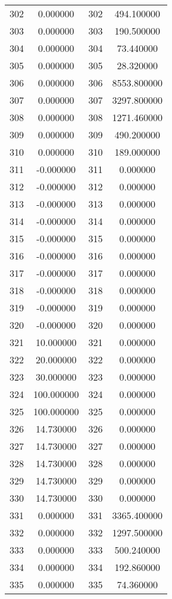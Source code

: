 \documentclass[12pt]{article}
\begin{document}
\begin{longtable}{@{}cccc@{}}
302 & 0.000000 & 302 & 494.100000 \\
303 & 0.000000 & 303 & 190.500000 \\
304 & 0.000000 & 304 & 73.440000 \\
305 & 0.000000 & 305 & 28.320000 \\
306 & 0.000000 & 306 & 8553.800000 \\
307 & 0.000000 & 307 & 3297.800000 \\
308 & 0.000000 & 308 & 1271.460000 \\
309 & 0.000000 & 309 & 490.200000 \\
310 & 0.000000 & 310 & 189.000000 \\
311 & -0.000000 & 311 & 0.000000 \\
312 & -0.000000 & 312 & 0.000000 \\
313 & -0.000000 & 313 & 0.000000 \\
314 & -0.000000 & 314 & 0.000000 \\
315 & -0.000000 & 315 & 0.000000 \\
316 & -0.000000 & 316 & 0.000000 \\
317 & -0.000000 & 317 & 0.000000 \\
318 & -0.000000 & 318 & 0.000000 \\
319 & -0.000000 & 319 & 0.000000 \\
320 & -0.000000 & 320 & 0.000000 \\
321 & 10.000000 & 321 & 0.000000 \\
322 & 20.000000 & 322 & 0.000000 \\
323 & 30.000000 & 323 & 0.000000 \\
324 & 100.000000 & 324 & 0.000000 \\
325 & 100.000000 & 325 & 0.000000 \\
326 & 14.730000 & 326 & 0.000000 \\
327 & 14.730000 & 327 & 0.000000 \\
328 & 14.730000 & 328 & 0.000000 \\
329 & 14.730000 & 329 & 0.000000 \\
330 & 14.730000 & 330 & 0.000000 \\
331 & 0.000000 & 331 & 3365.400000 \\
332 & 0.000000 & 332 & 1297.500000 \\
333 & 0.000000 & 333 & 500.240000 \\
334 & 0.000000 & 334 & 192.860000 \\
335 & 0.000000 & 335 & 74.360000 \\

\end{longtable}
\end{document}
